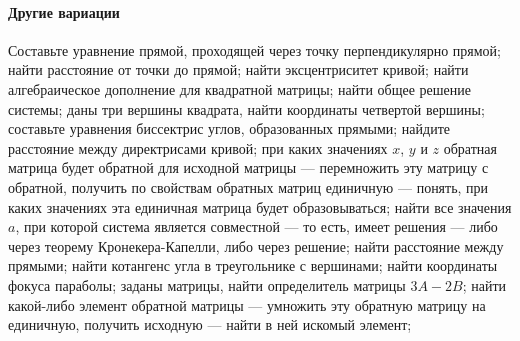 \documentclass{article}
\begin{document}
\begin{flushleft}
\paragraph{Другие вариации}

Составьте уравнение прямой, проходящей через точку перпендикулярно прямой; найти расстояние от точки до прямой; найти эксцентриситет кривой; найти алгебраическое дополнение для квадратной матрицы; найти общее решение системы; даны три вершины квадрата, найти координаты четвертой вершины; составьте уравнения биссектрис углов, образованных прямыми; найдите расстояние между директрисами кривой; при каких значениях $x$, $y$ и $z$ обратная матрица будет обратной для исходной матрицы — перемножить эту матрицу с обратной, получить по свойствам обратных матриц единичную — понять, при каких значениях эта единичная матрица будет образовываться; найти все значения $a$, при которой система является совместной — то есть, имеет решения — либо через теорему Кронекера-Капелли, либо через решение; найти расстояние между прямыми; найти котангенс угла в треугольнике с вершинами; найти координаты фокуса параболы; заданы матрицы, найти определитель матрицы $3A - 2B$; найти какой-либо элемент обратной матрицы — умножить эту обратную матрицу на единичную, получить исходную — найти в ней искомый элемент;

\end{flushleft}
\end{document}
